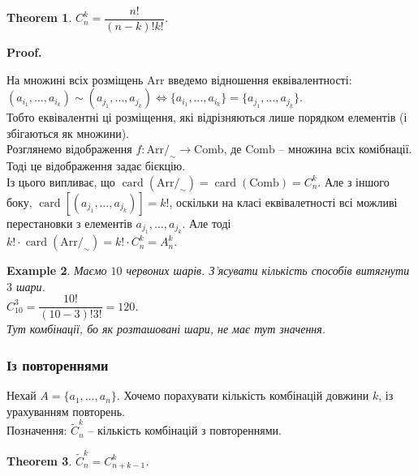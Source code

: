 \documentclass[a4paper, 14pt]{extarticle}
\makeatletter
\theoremstyle{theoremdd}
\newtheorem{theorem}{Theorem}[subsection]
\theoremstyle{theoremdd}
\theoremstyle{theoremdd}
\theoremstyle{theoremdd}
\theoremstyle{theoremdd}
\newtheorem{example}[theorem]{Example}
\theoremstyle{theoremdd}
\theoremstyle{theoremdd}
\theoremstyle{theoremdd}
\theoremstyle{theoremdd}
\theoremstyle{theoremdd}
\theoremstyle{theoremdd}
\theoremstyle{theoremdd}
\theoremstyle{theoremdd}
\theoremstyle{theoremdd}
\theoremstyle{theoremdd}
\renewenvironment{proof}[1][Proof.\\]{\par
\pushQED{\hfill \qed}%
\normalfont \topsep6\p@\@plus6\p@\relax
\trivlist
\item\relax
{\bfseries
#1\@addpunct{.}}\hspace\labelsep\ignorespaces
}{%
\popQED\endtrivlist\@endpefalse
}
\DeclareMathOperator{\card}{card}
\makeatother
\begin{document}
\begin{theorem}
$C_n^k = \dfrac{n!}{(n-k)! k!}$.
\end{theorem}

\begin{proof}
На множині всіх розміщень $\text{Arr}$ введемо відношення еквівалентності:\\
$(a_{i_1},\dots,a_{i_k}) \sim (a_{j_1},\dots,a_{j_k}) \iff \{a_{i_1},\dots,a_{i_k}\} = \{a_{j_1},\dots,a_{j_k}\}$.\\
Тобто еквівалентні ці розміщення, які відрізняються лише порядком елементів (і збігаються як множини). \\
Розглянемо відображення $f \colon \text{Arr}/_\sim \to \text{Comb}$, де $\text{Comb}$ -- множина всіх комібнації. Тоді це відображення задає бієкцію.\\
Із цього випливає, що $\card(\text{Arr}/_\sim) = \card(\text{Comb}) = C_n^k$. Але з іншого боку, $\card [(a_{j_1},\dots,a_{j_k})] = k!$, оскільки на класі еквівалетності всі можливі перестановки з елементів $a_{j_1},\dots,a_{j_k}$. Але тоді \\ $k! \cdot \card(\text{Arr}/_\sim) = k! \cdot C_n^k = A_n^k$.
\end{proof}

\begin{example}
Маємо $10$ червоних шарів. З'ясувати кількість способів витягнути $3$ шари.\\
$C_{10}^3 = \dfrac{10!}{(10-3)! 3!} = 120$.
\bigskip \\
Тут комбінації, бо як розташовані шари, не має тут значення.
\end{example}

\subsubsection*{Із повтореннями}
Нехай $A = \{a_1,\dots,a_n\}$. Хочемо порахувати кількість комбінацій довжини $k$, із урахуванням повторень.\\
Позначення: $\tilde{C}_n^k$ -- кількість комбінацій з повтореннями.

\begin{theorem}
$\tilde{C}_n^k = C_{n+k-1}^k$.
\end{theorem}
\end{document}
